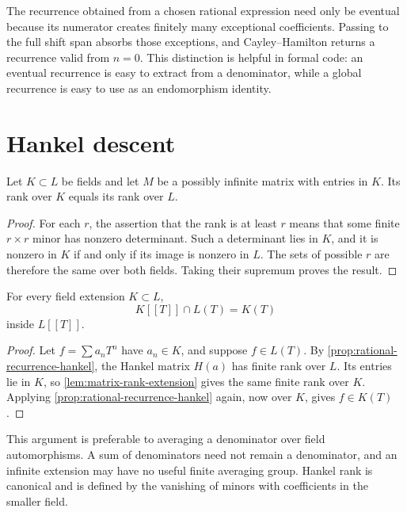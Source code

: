 \begin{remark}
The recurrence obtained from a chosen rational expression need only be
eventual because its numerator creates finitely many exceptional
coefficients.  Passing to the full shift span absorbs those exceptions,
and Cayley--Hamilton returns a recurrence valid from \(n=0\).  This
distinction is helpful in formal code: an eventual recurrence is easy to
extract from a denominator, while a global recurrence is easy to use as
an endomorphism identity.
\end{remark}

\section{Hankel descent}

\begin{lemma}
\label{lem:matrix-rank-extension}
Let \(K\subset L\) be fields and let \(M\) be a possibly infinite matrix
with entries in \(K\).  Its rank over \(K\) equals its rank over \(L\).
\end{lemma}

\begin{proof}
For each \(r\), the assertion that the rank is at least \(r\) means that
some finite \(r\times r\) minor has nonzero determinant.  Such a
determinant lies in \(K\), and it is nonzero in \(K\) if and only if its
image is nonzero in \(L\).  The sets of possible \(r\) are therefore the
same over both fields.  Taking their supremum proves the result.
\end{proof}

\begin{theorem}
\label{thm:hankel-descent}
For every field extension \(K\subset L\),
\[
  K[[T]]\cap L(T)=K(T)
\]
inside \(L[[T]]\).
\end{theorem}

\begin{proof}
Let \(f=\sum a_nT^n\) have \(a_n\in K\), and suppose
\(f\in L(T)\).  By
\cref{prop:rational-recurrence-hankel}, the Hankel matrix \(H(a)\) has
finite rank over \(L\).  Its entries lie in \(K\), so
\cref{lem:matrix-rank-extension} gives the same finite rank over \(K\).
Applying \cref{prop:rational-recurrence-hankel} again, now over \(K\),
gives \(f\in K(T)\).
\end{proof}

This argument is preferable to averaging a denominator over field
automorphisms.  A sum of denominators need not remain a denominator, and
an infinite extension may have no useful finite averaging group.  Hankel
rank is canonical and is defined by the vanishing of minors with
coefficients in the smaller field.

